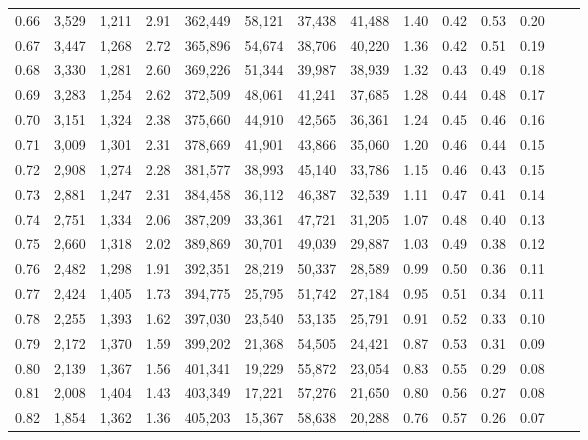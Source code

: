 \begin{tabular}{rrrrrrrrrrrrrr}
0.66 &  3,529 &  1,211 &     2.91 &  362,449 &   58,121 &  37,438 &  41,488 &  1.40 &  0.42 &  0.53 &      0.20 \\
0.67 &  3,447 &  1,268 &     2.72 &  365,896 &   54,674 &  38,706 &  40,220 &  1.36 &  0.42 &  0.51 &      0.19 \\
0.68 &  3,330 &  1,281 &     2.60 &  369,226 &   51,344 &  39,987 &  38,939 &  1.32 &  0.43 &  0.49 &      0.18 \\
0.69 &  3,283 &  1,254 &     2.62 &  372,509 &   48,061 &  41,241 &  37,685 &  1.28 &  0.44 &  0.48 &      0.17 \\
0.70 &  3,151 &  1,324 &     2.38 &  375,660 &   44,910 &  42,565 &  36,361 &  1.24 &  0.45 &  0.46 &      0.16 \\
0.71 &  3,009 &  1,301 &     2.31 &  378,669 &   41,901 &  43,866 &  35,060 &  1.20 &  0.46 &  0.44 &      0.15 \\
0.72 &  2,908 &  1,274 &     2.28 &  381,577 &   38,993 &  45,140 &  33,786 &  1.15 &  0.46 &  0.43 &      0.15 \\
0.73 &  2,881 &  1,247 &     2.31 &  384,458 &   36,112 &  46,387 &  32,539 &  1.11 &  0.47 &  0.41 &      0.14 \\
0.74 &  2,751 &  1,334 &     2.06 &  387,209 &   33,361 &  47,721 &  31,205 &  1.07 &  0.48 &  0.40 &      0.13 \\
0.75 &  2,660 &  1,318 &     2.02 &  389,869 &   30,701 &  49,039 &  29,887 &  1.03 &  0.49 &  0.38 &      0.12 \\
0.76 &  2,482 &  1,298 &     1.91 &  392,351 &   28,219 &  50,337 &  28,589 &  0.99 &  0.50 &  0.36 &      0.11 \\
0.77 &  2,424 &  1,405 &     1.73 &  394,775 &   25,795 &  51,742 &  27,184 &  0.95 &  0.51 &  0.34 &      0.11 \\
0.78 &  2,255 &  1,393 &     1.62 &  397,030 &   23,540 &  53,135 &  25,791 &  0.91 &  0.52 &  0.33 &      0.10 \\
0.79 &  2,172 &  1,370 &     1.59 &  399,202 &   21,368 &  54,505 &  24,421 &  0.87 &  0.53 &  0.31 &      0.09 \\
0.80 &  2,139 &  1,367 &     1.56 &  401,341 &   19,229 &  55,872 &  23,054 &  0.83 &  0.55 &  0.29 &      0.08 \\
0.81 &  2,008 &  1,404 &     1.43 &  403,349 &   17,221 &  57,276 &  21,650 &  0.80 &  0.56 &  0.27 &      0.08 \\
0.82 &  1,854 &  1,362 &     1.36 &  405,203 &   15,367 &  58,638 &  20,288 &  0.76 &  0.57 &  0.26 &      0.07 \\

\end{tabular}
